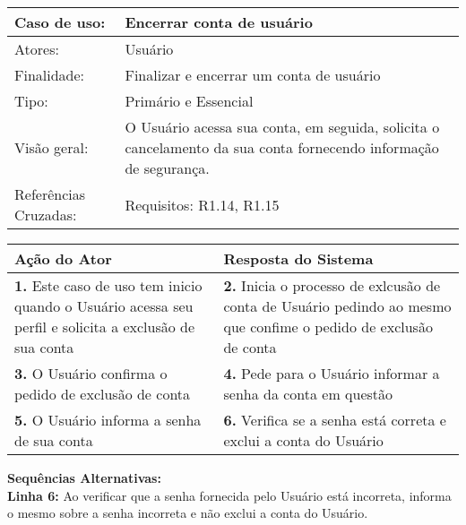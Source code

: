 \documentclass[12pt,a4paper,onecolumn,titlepage]{article}
\begin{document}
\begin{table}[h!]
\begin{center}
\begin{tabular}{p{2.5cm} p{9.5cm}}
Caso de uso: & \textbf{Encerrar conta de usuário} \\ \hline
Atores: & Usuário \\ \hline
Finalidade: & Finalizar e encerrar um conta de usuário\\ \hline
Tipo: & Primário e Essencial \\ \hline
Visão geral: & O Usuário acessa sua conta, em seguida, solicita o cancelamento da sua conta fornecendo informação de segurança. \\ \hline
Referências Cruzadas: & Requisitos: R1.14, R1.15\\

\end{tabular}
\end{center}
\end{table} 

\begin{center}
\def\arraystretch{1.1}
\begin{tabular}{|p{6cm}|p{6cm}|}

\hline
\textbf{Ação do Ator} & \textbf{Resposta do Sistema} \\ \hline
\textbf{1.} Este caso de uso tem inicio quando o Usuário acessa seu perfil e solicita a exclusão de sua conta  & \textbf{2.} Inicia o processo de exlcusão de conta de Usuário pedindo ao mesmo que confime o pedido de exclusão de conta \\ \hline
\textbf{3.} O Usuário confirma o pedido de exclusão de conta  & \textbf{4.} Pede para o Usuário informar a senha da conta em questão  \\ \hline
\textbf{5.} O Usuário informa a senha de sua conta  & \textbf{6.} Verifica se a senha está correta e exclui a conta do Usuário\\ \hline
\end{tabular}
\end{center}

\textbf{Sequências Alternativas:} \\
\textbf{Linha 6:} Ao verificar que a senha fornecida pelo Usuário está incorreta, informa o mesmo sobre a senha incorreta e não exclui a conta do Usuário.

\newpage
\end{document}
